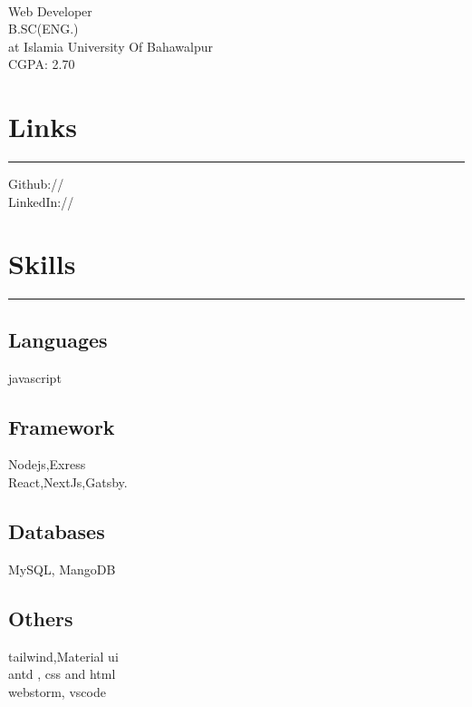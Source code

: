 \documentclass[]{junaid}
\begin{document}
%
%

\begin{minipage}[t]{0.33\textwidth} 
\begin{large}
\\
\end{large}
Web Developer\\
B.SC(ENG.)\\ 
at Islamia University Of Bahawalpur\\ 
CGPA: 2.70 
\section{Links} 
\noindent\rule{5cm}{0.4pt}

Github:// \href{https://github.com/joony786}{} \\
LinkedIn://  \href{https://www.linkedin.com/in/junaid-ashraf-751908114}{}
\section{Skills}
\noindent\rule{5cm}{0.4pt}

\subsection{Languages}
 javascript
\vspace{6pt}
\subsection{Framework}
Nodejs,Exress \\ React,NextJs,Gatsby.

\vspace{6pt}
\subsection{Databases}
MySQL, MangoDB
\vspace{6pt}
\subsection{Others}
tailwind,Material ui \\ antd , css and html \\
webstorm, vscode
\sectionsep


\end{minipage}
\end{document}

